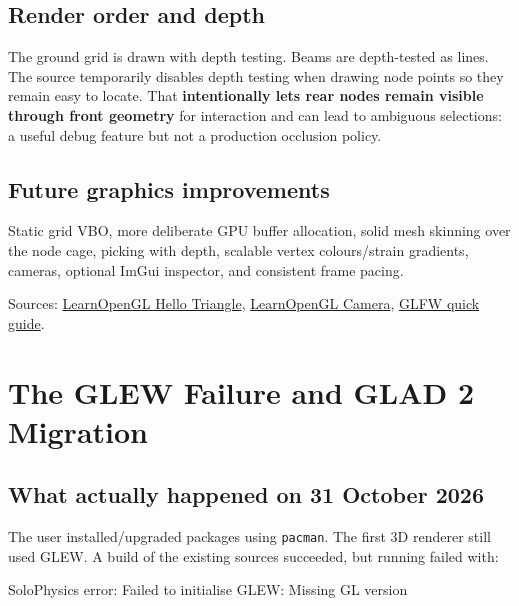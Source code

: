 \documentclass[
  10pt,
  a4paper,
]{article}
\newenvironment{Shaded}{\begin{snugshade}}{\end{snugshade}}
\newcommand{\NormalTok}[1]{#1}
\begin{document}
\subsection{Render order and depth}\label{render-order-and-depth}

The ground grid is drawn with depth testing. Beams are depth-tested as
lines. The source temporarily disables depth testing when drawing node
points so they remain easy to locate. That \textbf{intentionally lets
rear nodes remain visible through front geometry} for interaction and
can lead to ambiguous selections: a useful debug feature but not a
production occlusion policy.

\subsection{Future graphics
improvements}\label{future-graphics-improvements}

Static grid VBO, more deliberate GPU buffer allocation, solid mesh
skinning over the node cage, picking with depth, scalable vertex
colours/strain gradients, cameras, optional ImGui inspector, and
consistent frame pacing.

Sources:
\href{https://learnopengl.com/Getting-started/Hello-Triangle}{LearnOpenGL
Hello Triangle},
\href{https://learnopengl.com/Getting-started/Camera}{LearnOpenGL
Camera}, \href{https://www.glfw.org/docs/latest/quick_guide.html}{GLFW
quick guide}.

\newpage

\section{The GLEW Failure and GLAD 2
Migration}\label{the-glew-failure-and-glad-2-migration}

\subsection{What actually happened on 31 October
2026}\label{what-actually-happened-on-31-october-2026}

The user installed/upgraded packages using \texttt{pacman}. The first 3D
renderer still used GLEW. A build of the existing sources succeeded, but
running failed with:

\begin{Shaded}
\begin{Highlighting}[]
\NormalTok{SoloPhysics error: Failed to initialise GLEW: Missing GL version}
\end{Highlighting}
\end{Shaded}
\end{document}
